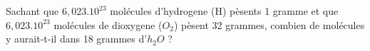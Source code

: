%
%
Sachant que $6,023.10^{23}$ molécules d'hydrogene (H) pèsents 1 gramme
et que $6,023.10^{23}$ molécules de dioxygene ($O_2$) pèsent 32 grammes,
combien de molécules y aurait-t-il dans 18 grammes d'$h_2O$ ?

